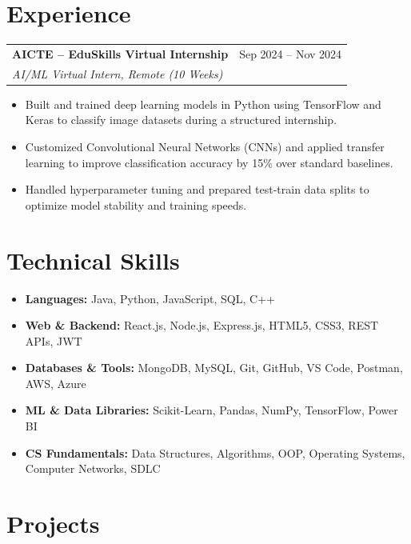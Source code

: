 \documentclass[10pt, a4paper]{article}
\begin{document}
\section*{Experience}
\vspace{1pt}
\begin{tabularx}{\textwidth}{@{}X r@{}}
  \textbf{AICTE – EduSkills Virtual Internship} & Sep 2024 – Nov 2024 \\
  \textit{AI/ML Virtual Intern, Remote (10 Weeks)} & \\
\end{tabularx}
\begin{itemize}
  \item Built and trained deep learning models in Python using TensorFlow and Keras to classify image datasets during a structured internship.
  \item Customized Convolutional Neural Networks (CNNs) and applied transfer learning to improve classification accuracy by 15\% over standard baselines.
  \item Handled hyperparameter tuning and prepared test-train data splits to optimize model stability and training speeds.
\end{itemize}

\section*{Technical Skills}
\vspace{1pt}
\begin{itemize}
  \item \textbf{Languages:} Java, Python, JavaScript, SQL, C++
  \item \textbf{Web \& Backend:} React.js, Node.js, Express.js, HTML5, CSS3, REST APIs, JWT
  \item \textbf{Databases \& Tools:} MongoDB, MySQL, Git, GitHub, VS Code, Postman, AWS, Azure
  \item \textbf{ML \& Data Libraries:} Scikit-Learn, Pandas, NumPy, TensorFlow, Power BI
  \item \textbf{CS Fundamentals:} Data Structures, Algorithms, OOP, Operating Systems, Computer Networks, SDLC
\end{itemize}

\section*{Projects}
\vspace{1pt}
\end{document}
